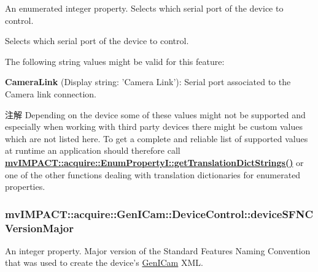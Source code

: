 An enumerated integer property. Selects which serial port of the device to control. 

Selects which serial port of the device to control.

The following string values might be valid for this feature\+:
\begin{DoxyItemize}
\item {\bfseries Camera\+Link} (Display string\+: 'Camera Link')\+: Serial port associated to the Camera link connection.
\end{DoxyItemize}

\begin{DoxyNote}{注解}
Depending on the device some of these values might not be supported and especially when working with third party devices there might be custom values which are not listed here. To get a complete and reliable list of supported values at runtime an application should therefore call {\bfseries \hyperlink{classmv_i_m_p_a_c_t_1_1acquire_1_1_enum_property_i_a0ba6ccbf5ee69784d5d0b537924d26b6}{mv\+I\+M\+P\+A\+C\+T\+::acquire\+::\+Enum\+Property\+I\+::get\+Translation\+Dict\+Strings()}} or one of the other functions dealing with translation dictionaries for enumerated properties. 
\end{DoxyNote}
\hypertarget{classmv_i_m_p_a_c_t_1_1acquire_1_1_gen_i_cam_1_1_device_control_ab9b1cb64c3dc9af2ec6f7a2c90a465ae}{
\subsubsection[{device\+S\+F\+N\+C\+Version\+Major}]{ mv\+I\+M\+P\+A\+C\+T\+::acquire\+::\+Gen\+I\+Cam\+::\+Device\+Control\+::device\+S\+F\+N\+C\+Version\+Major}}\label{classmv_i_m_p_a_c_t_1_1acquire_1_1_gen_i_cam_1_1_device_control_ab9b1cb64c3dc9af2ec6f7a2c90a465ae}


An integer property. Major version of the Standard Features Naming Convention that was used to create the device's \hyperlink{namespacemv_i_m_p_a_c_t_1_1acquire_1_1_gen_i_cam}{Gen\+I\+Cam} X\+M\+L. 

